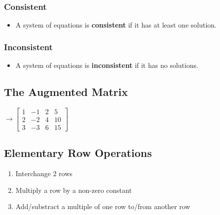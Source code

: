 \documentclass[
  letterpaper,
  DIV=11,
  numbers=noendperiod]{scrartcl}
\providecommand{\tightlist}{%
  \setlength{\itemsep}{0pt}\setlength{\parskip}{0pt}}\usepackage{longtable,booktabs,array}
\begin{document}
\begin{multicols}{2}
  \hypertarget{review-solve-the-following-systems}{%
  \subsubsection{Consistent}\label{consistent}}

  \begin{itemize}
    \tightlist
    \item A system of equations is \textbf{consistent} if it has at least one solution.
  \end{itemize}

\columnbreak

  \hypertarget{review-solve-the-following-systems}{%
  \subsubsection{Inconsistent}\label{inconsistent}}

  \begin{itemize}
    \tightlist
    \item A system of equations is \textbf{inconsistent} if it has no solutions.
  \end{itemize}

\end{multicols}

\newpage{}

\hypertarget{the-augmented-matrix}{%
\subsection{The Augmented Matrix}\label{the-augmented-matrix}}

\Large{}
\(\longrightarrow \left[\begin{array}{ccc|c}1 & -1 & 2 & 5 \\ 2 & -2 & 4 & 10 \\ 3 & -3 & 6 & 15 \end{array}\right]\)
\normalsize

\hypertarget{elementary-row-operations}{%
\subsection{Elementary Row Operations}\label{elementary-row-operations}}

\begin{enumerate}
\def\labelenumi{\arabic{enumi}.}
\tightlist
\item
  Interchange 2 rows
\item
  Multiply a row by a non-zero constant
\item
  Add/substract a multiple of one row to/from another row
\end{enumerate}
\end{document}
